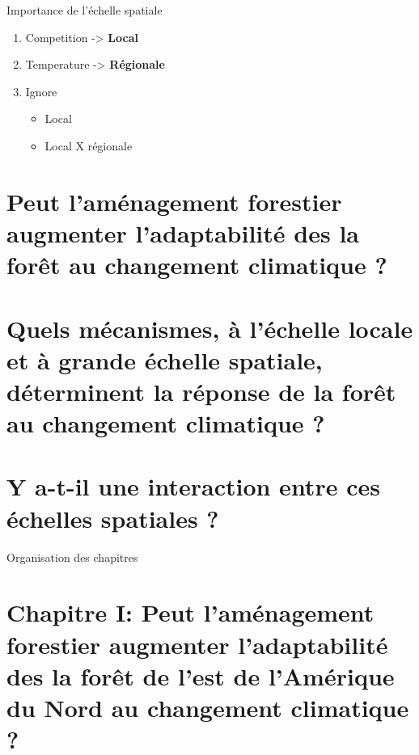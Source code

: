 \documentclass[11pt, compress, aspectratio=1610]{beamer}
\providecommand{\tightlist}{%
  \setlength{\itemsep}{0pt}\setlength{\parskip}{0pt}}
\begin{document}
\begin{frame}{Importance de l'échelle spatiale}

\begin{enumerate}
\def\labelenumi{\arabic{enumi}.}
\tightlist
\item
  Competition -\textgreater{} \textbf{Local}
\item
  Temperature -\textgreater{} \textbf{Régionale}
\item
  Ignore

  \begin{itemize}
  \tightlist
  \item
    Local
  \item
    Local X régionale
  \end{itemize}
\end{enumerate}

\end{frame}

\section{Peut l'aménagement forestier augmenter l'adaptabilité des la
forêt au changement climatique
?}\label{peut-lamuxe9nagement-forestier-augmenter-ladaptabilituxe9-des-la-foruxeat-au-changement-climatique}

\section{Quels mécanismes, à l'échelle locale et à grande échelle
spatiale, déterminent la réponse de la forêt au changement climatique
?}\label{quels-muxe9canismes-uxe0-luxe9chelle-locale-et-uxe0-grande-uxe9chelle-spatiale-duxe9terminent-la-ruxe9ponse-de-la-foruxeat-au-changement-climatique}

\section{Y a-t-il une interaction entre ces échelles spatiales
?}\label{y-a-t-il-une-interaction-entre-ces-uxe9chelles-spatiales}

\begin{frame}{Organisation des chapitres}



\end{frame}

\section{\texorpdfstring{Chapitre I: \newline Peut l'aménagement
forestier augmenter l'adaptabilité des la forêt de l'est de l'Amérique
du Nord au changement climatique
?}{Chapitre I: Peut l'aménagement forestier augmenter l'adaptabilité des la forêt de l'est de l'Amérique du Nord au changement climatique ?}}\label{chapitre-i-peut-lamuxe9nagement-forestier-augmenter-ladaptabilituxe9-des-la-foruxeat-de-lest-de-lamuxe9rique-du-nord-au-changement-climatique}
\end{document}
